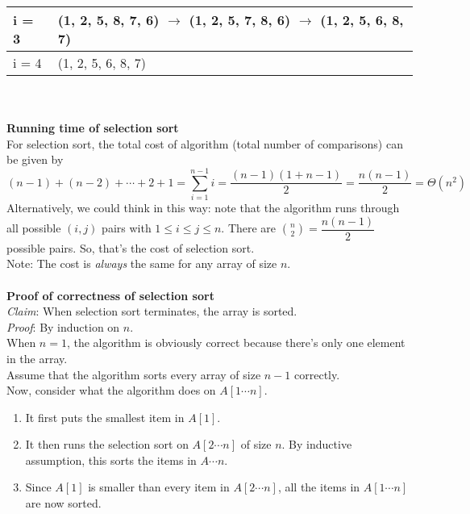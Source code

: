 \documentclass[11pt]{article}
\begin{document}
\begin{enumerate}
\begin{enumerate}
\begin{enumerate}
\begin{tabular}{|l|l|}
\hline
i = 3& (1, 2, 5, 8, 7, 6) $\rightarrow$ (1, 2, 5, 7, 8, 6) $\rightarrow$ (1, 2, 5, 6, 8, 7)\\
\hline
i = 4& (1, 2, 5, 6, 8, 7)\\
\hline
\end{tabular}\\\\
\textbf{Running time of selection sort}\\
For selection sort, the total cost of algorithm (total number of comparisons) can be given by $$(n-1) + (n-2) + \cdots +2+1 = \sum_{i = 1}^{n-1} i = \dfrac{(n-1)(1+n-1)}{2} = \dfrac{n(n-1)}{2} = \Theta(n^2)$$
Alternatively, we could think in this way: note that the algorithm runs through all possible $(i, j)$ pairs  with $1 \leq i \leq j \leq n$. There are ${n \choose 2} = \dfrac{n (n-1)}{2}$ possible pairs. So, that's the cost of selection sort.\\
Note: The cost is \textit{always} the same for any array of size $n$.\\\\
\textbf{Proof of correctness of selection sort}\\
\textit{Claim}: When selection sort terminates, the array is sorted.\\
\textit{Proof}: By induction on $n$.\\
When $n = 1$, the algorithm is obviously correct because there's only one element in the array.\\
Assume that the algorithm sorts every array of size $n - 1$ correctly.\\
Now, consider what the algorithm does on $A[1 \cdots n]$.
\begin{enumerate}
\item It first puts the smallest item in $A[1]$.
\item It then runs the selection sort on $A[2 \cdots n]$ of size $n$. By inductive assumption, this sorts the items in $A \cdots n$.
\item Since $A[1]$ is smaller than every item in $A[2 \cdots n]$, all the items in $A[1 \cdots n]$ are now sorted.
\end{enumerate}


\end{enumerate}
\end{enumerate}
\end{enumerate}
\end{document}
